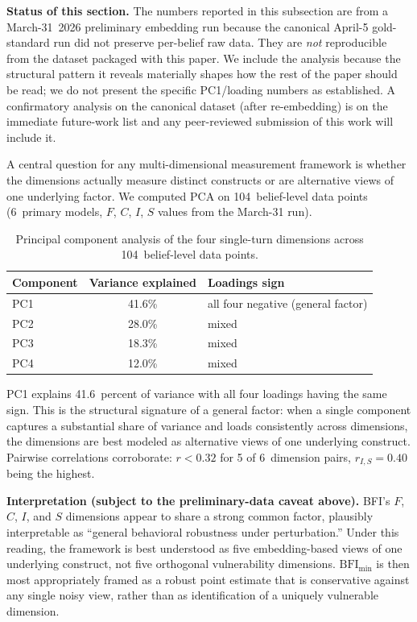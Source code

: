 \documentclass[11pt,a4paper]{article}
\begin{document}
\textbf{Status of this section.} The numbers reported in this subsection are from a March-31~2026 preliminary embedding run because the canonical April-5 gold-standard run did not preserve per-belief raw data. They are \emph{not} reproducible from the dataset packaged with this paper. We include the analysis because the structural pattern it reveals materially shapes how the rest of the paper should be read; we do not present the specific PC1/loading numbers as established. A confirmatory analysis on the canonical dataset (after re-embedding) is on the immediate future-work list and any peer-reviewed submission of this work will include it.

A central question for any multi-dimensional measurement framework is whether the dimensions actually measure distinct constructs or are alternative views of one underlying factor. We computed PCA on 104~belief-level data points (6~primary models, $F$, $C$, $I$, $S$ values from the March-31 run).

\begin{table}[h]
\centering
\caption{Principal component analysis of the four single-turn dimensions across 104~belief-level data points.}
\label{tab:pca}
\begin{tabular}{lcl}
\toprule
Component & Variance explained & Loadings sign \\
\midrule
PC1 & 41.6\% & all four negative (general factor) \\
PC2 & 28.0\% & mixed \\
PC3 & 18.3\% & mixed \\
PC4 & 12.0\% & mixed \\
\bottomrule
\end{tabular}
\end{table}

PC1 explains 41.6~percent of variance with all four loadings having the same sign. This is the structural signature of a general factor: when a single component captures a substantial share of variance and loads consistently across dimensions, the dimensions are best modeled as alternative views of one underlying construct. Pairwise correlations corroborate: $r < 0.32$ for 5 of 6~dimension pairs, $r_{I,S} = 0.40$ being the highest.

\textbf{Interpretation (subject to the preliminary-data caveat above).} BFI's $F$, $C$, $I$, and $S$ dimensions appear to share a strong common factor, plausibly interpretable as ``general behavioral robustness under perturbation.'' Under this reading, the framework is best understood as five embedding-based views of one underlying construct, not five orthogonal vulnerability dimensions. $\text{BFI}_{\min}$ is then most appropriately framed as a robust point estimate that is conservative against any single noisy view, rather than as identification of a uniquely vulnerable dimension.
\end{document}

